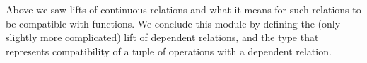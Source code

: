 Above we saw lifts of continuous relations and what it means for such relations to be compatible with functions. We conclude this module by defining the (only slightly more complicated) lift of dependent relations, and the type that represents compatibility of a tuple of operations with a dependent relation.
\ccpad
\begin{code}%
\>[0]\AgdaSpace{}%
\AgdaModule{\AgdaUnderscore{}}\AgdaSpace{}%
\AgdaSymbol{\{}\AgdaSpace{}%
\AgdaSpace{}%
\AgdaSpace{}%
\AgdaSymbol{:}\AgdaSpace{}%
\AgdaSymbol{\}}\AgdaSpace{}%
\AgdaSymbol{\{}\AgdaSpace{}%
\AgdaSpace{}%
\AgdaSymbol{:}\AgdaSpace{}%
\AgdaSpace{}%
\AgdaSymbol{\}}\AgdaSpace{}%
\AgdaSymbol{\{}\AgdaSpace{}%
\AgdaSymbol{:}\AgdaSpace{}%
\AgdaSpace{}%
\AgdaSpace{}%
\AgdaSpace{}%
\AgdaSymbol{\}}\AgdaSpace{}%
\<%
\\
%
\\[\AgdaEmptyExtraSkip]%
\>[0][@{}l@{\AgdaIndent{0}}]%
\>[1]\AgdaSpace{}%
\AgdaSymbol{:}\AgdaSpace{}%
\AgdaSpace{}%
\AgdaSpace{}%
\AgdaSpace{}%
\AgdaSpace{}%
\AgdaSpace{}%
\AgdaSpace{}%
\AgdaSpace{}%
\AgdaSpace{}%
\AgdaSpace{}%
\AgdaSpace{}%
\AgdaSpace{}%
\AgdaSymbol{)}\AgdaSpace{}%
\AgdaSpace{}%
\AgdaSpace{}%
\AgdaSpace{}%
\AgdaSpace{}%
\<%
\\
%
\>[1]\AgdaSpace{}%
\AgdaSpace{}%
\AgdaSpace{}%
\AgdaSymbol{=}\AgdaSpace{}%
\AgdaSpace{}%
\AgdaSymbol{(}\AgdaSpace{}%
\AgdaSymbol{:}\AgdaSpace{}%
\AgdaSymbol{)}\AgdaSpace{}%
\AgdaSpace{}%
\AgdaSpace{}%
\AgdaSpace{}%
\AgdaSpace{}%
\AgdaSpace{}%
\AgdaSymbol{(}\AgdaSpace{}%
\AgdaSymbol{)}\AgdaSpace{}%
\AgdaSymbol{)}\<%
\\
%
\\[\AgdaEmptyExtraSkip]%
%
\>[1]\AgdaSpace{}%
\AgdaSymbol{:}\AgdaSpace{}%
\AgdaSpace{}%
\AgdaSpace{}%
\AgdaSpace{}%

\end{code}

